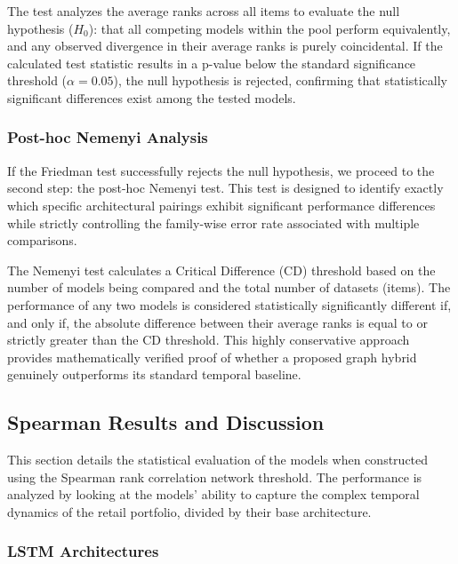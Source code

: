 The test analyzes the average ranks across all items to evaluate the null hypothesis ($H_0$): that all competing models within the pool perform equivalently, and any observed divergence in their average ranks is purely coincidental. If the calculated test statistic results in a p-value below the standard significance threshold ($\alpha = 0.05$), the null hypothesis is rejected, confirming that statistically significant differences exist among the tested models.

\subsubsection{Post-hoc Nemenyi Analysis}
\label{subsubsec:posthoc_nemenyi}

If the Friedman test successfully rejects the null hypothesis, we proceed to the second step: the post-hoc Nemenyi test. This test is designed to identify exactly which specific architectural pairings exhibit significant performance differences while strictly controlling the family-wise error rate associated with multiple comparisons.

The Nemenyi test calculates a Critical Difference (CD) threshold based on the number of models being compared and the total number of datasets (items). The performance of any two models is considered statistically significantly different if, and only if, the absolute difference between their average ranks is equal to or strictly greater than the CD threshold. This highly conservative approach provides mathematically verified proof of whether a proposed graph hybrid genuinely outperforms its standard temporal baseline.

\subsection{Spearman Results and Discussion}
\label{subsec:spearman_results}

This section details the statistical evaluation of the models when constructed using the Spearman rank correlation network threshold. The performance is analyzed by looking at the models' ability to capture the complex temporal dynamics of the retail portfolio, divided by their base architecture.

\subsubsection{LSTM Architectures}
\label{subsubsec:spearman_lstm}

